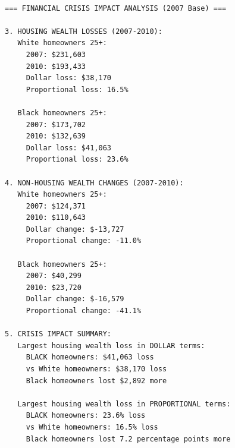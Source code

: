 \documentclass[
  letterpaper,
  DIV=11,
  numbers=noendperiod]{scrartcl}
\begin{document}
\begin{verbatim}

=== FINANCIAL CRISIS IMPACT ANALYSIS (2007 Base) ===

3. HOUSING WEALTH LOSSES (2007-2010):
   White homeowners 25+:
     2007: $231,603
     2010: $193,433
     Dollar loss: $38,170
     Proportional loss: 16.5%

   Black homeowners 25+:
     2007: $173,702
     2010: $132,639
     Dollar loss: $41,063
     Proportional loss: 23.6%

4. NON-HOUSING WEALTH CHANGES (2007-2010):
   White homeowners 25+:
     2007: $124,371
     2010: $110,643
     Dollar change: $-13,727
     Proportional change: -11.0%

   Black homeowners 25+:
     2007: $40,299
     2010: $23,720
     Dollar change: $-16,579
     Proportional change: -41.1%

5. CRISIS IMPACT SUMMARY:
   Largest housing wealth loss in DOLLAR terms:
     BLACK homeowners: $41,063 loss
     vs White homeowners: $38,170 loss
     Black homeowners lost $2,892 more

   Largest housing wealth loss in PROPORTIONAL terms:
     BLACK homeowners: 23.6% loss
     vs White homeowners: 16.5% loss
     Black homeowners lost 7.2 percentage points more
\end{verbatim}
\end{document}
